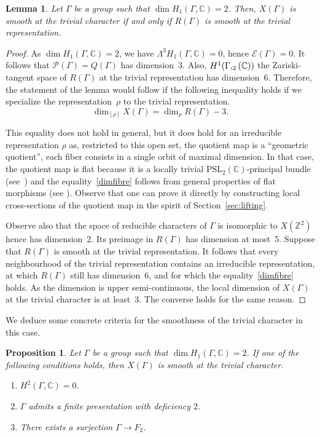 \documentclass[JEP,XML,SOM,Unicode,NoEqCountersInSection]{cedram}
\let\mathcal\mathscr
\newcommand{\NoChangel}[1]{%
\expandafter\let\csname old\string#1\endcsname=#1
\let#1=\relax
\newcommand{#1}{\mathcode`l="716C\csname old\string#1\endcsname\mathcode`l="7160 }%
}
\newtheorem{proposition}[theorem]{Proposition}
\newtheorem{lemma}[theorem]{Lemma}
\theoremstyle{definition}
\newcommand{\ZZ}{\mathbb{Z}}
\newcommand{\CC}{\mathbb{C}}
\newcommand{\petitsl}{\mathrm{sl}}\NoChangel{\petitsl}
\begin{document}
\begin{lemma}\label{lem:Rsuffit}
Let $\Gamma$ be a group such that $\dim H_1(\Gamma,\CC)=2$.
Then, $X(\Gamma)$ is smooth at the trivial character if and only if
$R(\Gamma)$ is smooth at the trivial representation.
\end{lemma}
\begin{proof}
As $\dim H_1(\Gamma,\CC)=2$, we have
$\Lambda^3 H_1(\Gamma,\CC)=0$, hence $\mathcal{E}(\Gamma)=0$.
It follows that $\mathcal{P}(\Gamma)=Q(\Gamma)$ has dimension~3.
Also, $H^1(\Gamma,\petitsl_2(\CC))$ \ie the Zariski-tangent
space of $R(\Gamma)$ at the trivial representation has dimension~6.
Therefore, the statement of the lemma would follow if
the following inequality holds if we specialize the representation~$\rho$
to the trivial representation.
\begin{equation}\label{dimfibre}
\dim_{[\rho]} X(\Gamma) = \dim_\rho R(\Gamma)-3.
\end{equation}

This equality does not hold in general, but it does hold for an
irreducible representation $\rho$ as, restricted to this open set, the
quotient map is a ``geometric quotient'', \ie 
each fiber consists in a
single orbit of maximal dimension. In that case, the quotient map is flat
because it is a locally trivial $\mathrm{PSL}_2(\CC)$-principal bundle
(see~\cite[Prop.\,0.9]{GIT}) and the equality~\eqref{dimfibre}
follows from general properties of flat morphisms
(see \eg \cite[Th.\,3.12]{Liu}).
Observe that one can prove it directly
by constructing local cross-sections of the quotient map in the spirit of
Section~\ref{sec:lifting}.

Observe also that the space of reducible characters of $\Gamma$ is
isomorphic to $X(\ZZ^2)$ hence has dimension~2. Its preimage in $R(\Gamma)$
has dimension at most~5. Suppose that $R(\Gamma)$ is smooth at the trivial
representation. It follows that every neighbourhood of the trivial
representation contains an irreducible representation, at which $R(\Gamma)$
still has dimension~6, and for which the equality~\eqref{dimfibre} holds.
As the dimension is upper semi-continuous,
the local dimension of $X(\Gamma)$ at the trivial
character is at least~3. The converse holds for the same reason.
\end{proof}

We deduce some concrete criteria for the smoothness of the trivial
character in this case.

\begin{proposition}\label{criteres}
Let $\Gamma$ be a group such that $\dim H_1(\Gamma,\CC)=2$. If one of the
following conditions holds, then $X(\Gamma)$ is smooth at the trivial
character.
\begin{enumerate}
\item $H^2(\Gamma,\CC)=0$.
\item $\Gamma$ admits a finite presentation with deficiency $2$.
\item There exists a surjection $\Gamma\to F_2$.
\end{enumerate}
\end{proposition}
\end{document}
